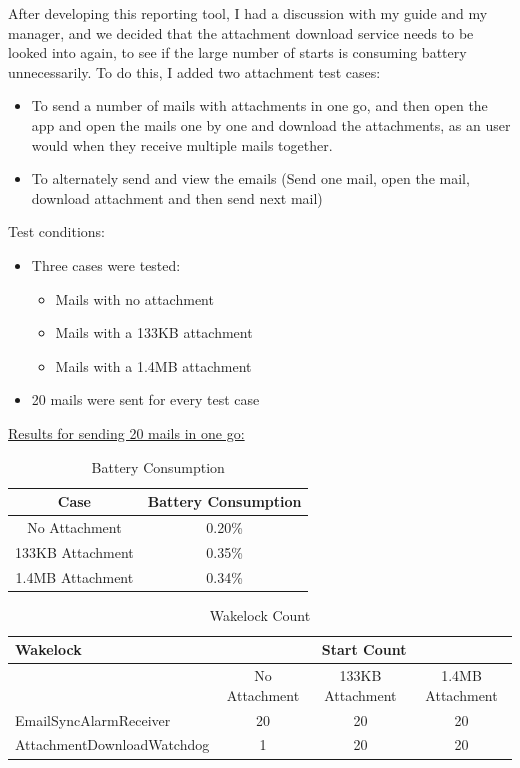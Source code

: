 \documentclass[a4paper,12pt]{article}
\begin{document}
After developing this reporting tool, I had a discussion with my guide and my manager, and we decided that the attachment download service needs to be looked into again, to see if the large number of starts is consuming battery unnecessarily. To do this, I added two attachment test cases:
\begin{itemize}
	\item To send a number of mails with attachments in one go, and then open the app and open the mails one by one and download the attachments, as an user would when they receive multiple mails together.
	\item To alternately send and view the emails (Send one mail, open the mail, download attachment and then send next mail)
\end{itemize}
Test conditions:
\begin{itemize}
	\item Three cases were tested:
	\begin{itemize}
		\item Mails with no attachment
		\item Mails with a 133KB attachment
		\item Mails with a 1.4MB attachment
	\end{itemize}
	\item 20 mails were sent for every test case
\end{itemize}
\pagebreak
\underline{Results for sending 20 mails in one go:} \\
\begin{table}[!h]
\centering
\caption{Battery Consumption}
\begin{tabular}{|c|c|}
\hline
Case & Battery Consumption\\ \hline
No Attachment & 0.20\%\\ \hline
133KB Attachment & 0.35\% \\ \hline
1.4MB Attachment & 0.34\% \\ \hline 
\end{tabular}
\end{table}
\begin{table}[!h]
\centering
\caption{Wakelock Count}
\label{my-label}
\begin{tabular}{|l|c|c|c|}
\hline
Wakelock                            & \multicolumn{3}{c|}{Start Count}                    \\ \hline
                                    & No Attachment & 133KB Attachment & 1.4MB Attachment \\ \hline
EmailSyncAlarmReceiver              & 20            & 20               & 20               \\ \hline
AttachmentDownloadWatchdog & 1             & 20               & 20               \\ \hline
\end{tabular}
\end{table}
\end{document}
